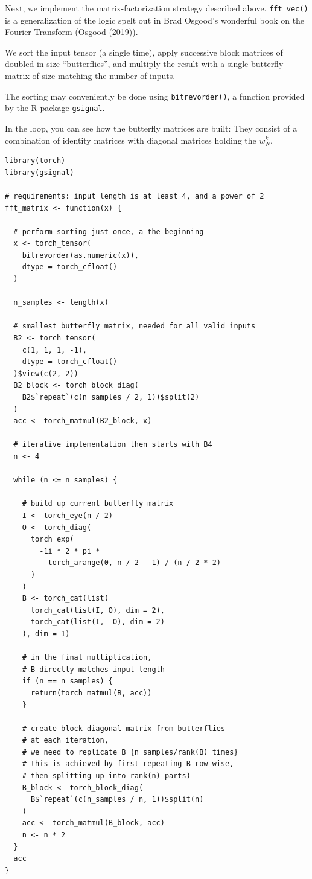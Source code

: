 \documentclass[
  letterpaper,
]{krantz}
\begin{document}
Next, we implement the matrix-factorization strategy described above.
\texttt{fft\_vec()} is a generalization of the logic spelt out in Brad
Osgood's wonderful book on the Fourier Transform (Osgood (2019)).

We sort the input tensor (a single time), apply successive block
matrices of doubled-in-size ``butterflies'', and multiply the result
with a single butterfly matrix of size matching the number of inputs.

The sorting may conveniently be done using \texttt{bitrevorder()}, a
function provided by the R package \texttt{gsignal}.

In the loop, you can see how the butterfly matrices are built: They
consist of a combination of identity matrices with diagonal matrices
holding the \(w^k_N\).

\begin{verbatim}
library(torch)
library(gsignal)

# requirements: input length is at least 4, and a power of 2
fft_matrix <- function(x) {

  # perform sorting just once, a the beginning
  x <- torch_tensor(
    bitrevorder(as.numeric(x)),
    dtype = torch_cfloat()
  )

  n_samples <- length(x)

  # smallest butterfly matrix, needed for all valid inputs
  B2 <- torch_tensor(
    c(1, 1, 1, -1),
    dtype = torch_cfloat()
  )$view(c(2, 2))
  B2_block <- torch_block_diag(
    B2$`repeat`(c(n_samples / 2, 1))$split(2)
  )
  acc <- torch_matmul(B2_block, x)

  # iterative implementation then starts with B4
  n <- 4

  while (n <= n_samples) {

    # build up current butterfly matrix
    I <- torch_eye(n / 2)
    O <- torch_diag(
      torch_exp(
        -1i * 2 * pi *
          torch_arange(0, n / 2 - 1) / (n / 2 * 2)
      )
    )
    B <- torch_cat(list(
      torch_cat(list(I, O), dim = 2),
      torch_cat(list(I, -O), dim = 2)
    ), dim = 1)

    # in the final multiplication,
    # B directly matches input length
    if (n == n_samples) {
      return(torch_matmul(B, acc))
    }

    # create block-diagonal matrix from butterflies
    # at each iteration,
    # we need to replicate B {n_samples/rank(B) times}
    # this is achieved by first repeating B row-wise,
    # then splitting up into rank(n) parts)
    B_block <- torch_block_diag(
      B$`repeat`(c(n_samples / n, 1))$split(n)
    )
    acc <- torch_matmul(B_block, acc)
    n <- n * 2
  }
  acc
}
\end{verbatim}
\end{document}
